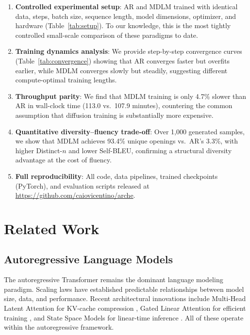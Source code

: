 \documentclass[11pt,a4paper]{article}
\begin{document}
\begin{enumerate}[leftmargin=*,itemsep=2pt]
  \item \textbf{Controlled experimental setup}: AR and MDLM trained with identical data, steps, batch size, sequence length, model dimensions, optimizer, and hardware (Table~\ref{tab:setup}). To our knowledge, this is the most tightly controlled small-scale comparison of these paradigms to date.

  \item \textbf{Training dynamics analysis}: We provide step-by-step convergence curves (Table~\ref{tab:convergence}) showing that AR converges faster but overfits earlier, while MDLM converges slowly but steadily, suggesting different compute-optimal training lengths.

  \item \textbf{Throughput parity}: We find that MDLM training is only 4.7\% slower than AR in wall-clock time (113.0 vs.\ 107.9 minutes), countering the common assumption that diffusion training is substantially more expensive.

  \item \textbf{Quantitative diversity--fluency trade-off}: Over 1{,}000 generated samples, we show that MDLM achieves 93.4\% unique openings vs.\ AR's 3.3\%, with higher Distinct-$n$ and lower Self-BLEU, confirming a structural diversity advantage at the cost of fluency.

  \item \textbf{Full reproducibility}: All code, data pipelines, trained checkpoints (PyTorch), and evaluation scripts released at \url{https://github.com/caiovicentino/arche}.
\end{enumerate}

\section{Related Work}

\subsection{Autoregressive Language Models}

The autoregressive Transformer \citep{vaswani2017attention,radford2019gpt2} remains the dominant language modeling paradigm.
Scaling laws \citep{kaplan2020scaling,hoffmann2022chinchilla} have established predictable relationships between model size, data, and performance.
Recent architectural innovations include Multi-Head Latent Attention for KV-cache compression \citep{deepseekv2}, Gated Linear Attention for efficient training \citep{yang2024gla}, and State Space Models for linear-time inference \citep{gu2023mamba}.
All of these operate within the autoregressive framework.
\end{document}
